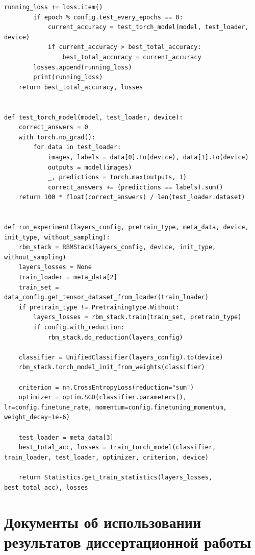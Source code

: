 \begin{lstlisting}[style=PythonStyle]
            running_loss += loss.item()
        if epoch % config.test_every_epochs == 0:
            current_accuracy = test_torch_model(model, test_loader, device)
            if current_accuracy > best_total_accuracy:
                best_total_accuracy = current_accuracy
        losses.append(running_loss)
        print(running_loss)
    return best_total_accuracy, losses


def test_torch_model(model, test_loader, device):
    correct_answers = 0
    with torch.no_grad():
        for data in test_loader:
            images, labels = data[0].to(device), data[1].to(device)
            outputs = model(images)
            _, predictions = torch.max(outputs, 1)
            correct_answers += (predictions == labels).sum()
    return 100 * float(correct_answers) / len(test_loader.dataset)


def run_experiment(layers_config, pretrain_type, meta_data, device, init_type, without_sampling):
    rbm_stack = RBMStack(layers_config, device, init_type, without_sampling)
    layers_losses = None
    train_loader = meta_data[2]
    train_set = data_config.get_tensor_dataset_from_loader(train_loader)
    if pretrain_type != PretrainingType.Without:
        layers_losses = rbm_stack.train(train_set, pretrain_type)
        if config.with_reduction:
            rbm_stack.do_reduction(layers_config)

    classifier = UnifiedClassifier(layers_config).to(device)
    rbm_stack.torch_model_init_from_weights(classifier)

    criterion = nn.CrossEntropyLoss(reduction="sum")
    optimizer = optim.SGD(classifier.parameters(), lr=config.finetune_rate, momentum=config.finetuning_momentum, weight_decay=1e-6)

    test_loader = meta_data[3]
    best_total_acc, losses = train_torch_model(classifier, train_loader, test_loader, optimizer, criterion, device)

    return Statistics.get_train_statistics(layers_losses, best_total_acc), losses
\end{lstlisting}

\chapter{Документы об использовании результатов диссертационной работы}
\label{app:b}


